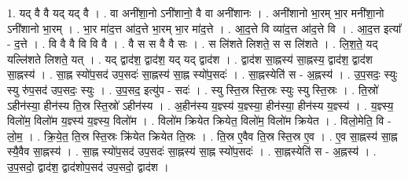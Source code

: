 \documentclass[17pt]{extarticle}
\begin{document}
1. यद् वै वै यद् यद् वै । . वा अनी॑शा॒नो ऽनी॑शानो॒ वै वा अनी॑शानः । . अनी॑शानो भा॒रम् भा॒र मनी॑शा॒नो ऽनी॑शानो भा॒रम् । . भा॒र मा॑द॒त्त आ॑द॒त्ते भा॒रम् भा॒र मा॑द॒त्ते । . आ॒द॒त्ते वि व्या॑द॒त्त आ॑द॒त्ते वि । . आ॒द॒त्त इत्या᳚ - द॒त्ते । . वि वै वै वि वि वै । . वै स स वै वै सः । . स लि॑शते लिशते॒ स स लि॑शते । . लि॒श॒ते॒ यद् यल्लि॑शते लिशते॒ यत् । . यद् द्वाद॑श॒ द्वाद॑श॒ यद् यद् द्वाद॑श । . द्वाद॑श सा॒ह्नस्य॑ सा॒ह्नस्य॒ द्वाद॑श॒ द्वाद॑श सा॒ह्नस्य॑ । . सा॒ह्न स्यो॑प॒सद॑ उप॒सदः॑ सा॒ह्नस्य॑ सा॒ह्न स्यो॑प॒सदः॑ । . सा॒ह्नस्येति॑ स - अ॒ह्नस्य॑ । . उ॒प॒सदः॒ स्युः स्यु रु॑प॒सद॑ उप॒सदः॒ स्युः । . उ॒प॒सद॒ इत्यु॑प - सदः॑ । . स्यु स्ति॒स्र स्ति॒स्रः स्युः स्यु स्ति॒स्रः । . ति॒स्रो॑ ऽहीन॑स्या॒ हीन॑स्य ति॒स्र स्ति॒स्रो॑ ऽहीन॑स्य । . अ॒हीन॑स्य य॒ज्ञ्स्य॑ य॒ज्ञ्स्या॒ हीन॑स्या॒ हीन॑स्य य॒ज्ञ्स्य॑ । . य॒ज्ञ्स्य॒ विलो॑म॒ विलो॑म य॒ज्ञ्स्य॑ य॒ज्ञ्स्य॒ विलो॑म । . विलो॑म क्रियेत क्रियेत॒ विलो॑म॒ विलो॑म क्रियेत । . विलो॒मेति॒ वि - लो॒म॒ । . क्रि॒ये॒त॒ ति॒स्र स्ति॒स्रः क्रि॑येत क्रियेत ति॒स्रः । . ति॒स्र ए॒वैव ति॒स्र स्ति॒स्र ए॒व । . ए॒व सा॒ह्नस्य॑ सा॒ह्न स्यै॒वैव सा॒ह्नस्य॑ । . सा॒ह्न स्यो॑प॒सद॑ उप॒सदः॑ सा॒ह्नस्य॑ सा॒ह्न स्यो॑प॒सदः॑ । . सा॒ह्नस्येति॑ स - अ॒ह्नस्य॑ । . उ॒प॒सदो॒ द्वाद॑श॒ द्वाद॑शोप॒सद॑ उप॒सदो॒ द्वाद॑श । \newline
\end{document}
